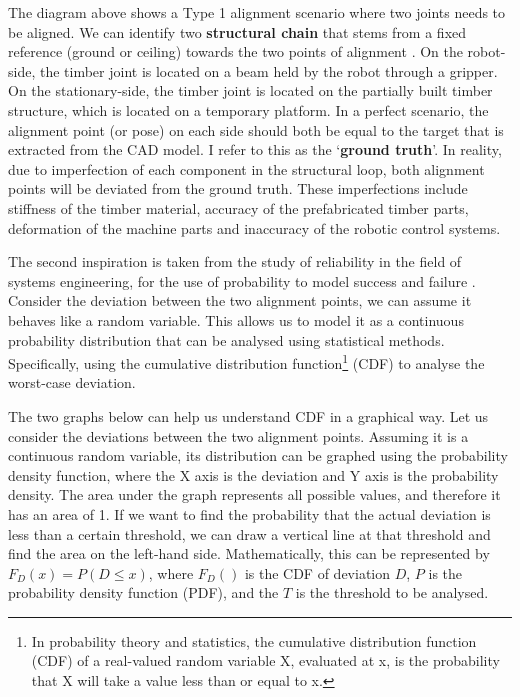 

The diagram above shows a Type 1 alignment scenario where two joints needs to be aligned. We can identify two \textbf{structural chain }that stems from a fixed reference (ground or ceiling) towards the two points of alignment \parencite{slocumPrecisionMachineDesign1992}. On the robot-side, the timber joint is located on a beam held by the robot through a gripper. On the stationary-side, the timber joint is located on the partially built timber structure, which is located on a temporary platform. In a perfect scenario, the alignment point (or pose) on each side should both be equal to the target that is extracted from the CAD model. I refer to this as the ‘\textbf{ground truth}’. In reality, due to imperfection of each component in the structural loop, both alignment points will be deviated from the ground truth. These imperfections include stiffness of the timber material, accuracy of the prefabricated timber parts, deformation of the machine parts and inaccuracy of the robotic control systems. 

The second inspiration is taken from the study of reliability in the field of systems engineering, for the use of probability to model success and failure \parencite{hallmannToleranceAllocationTolerancecost2020}. Consider the deviation between the two alignment points, we can assume it behaves like a random variable. This allows us to model it as a continuous probability distribution that can be analysed using statistical methods. Specifically, using the cumulative distribution function\footnote{ In probability theory and statistics, the cumulative distribution function (CDF) of a real-valued random variable X, evaluated at x, is the probability that X will take a value less than or equal to x. } (CDF) to analyse the worst-case deviation.

The two graphs below can help us understand CDF in a graphical way. Let us consider the deviations between the two alignment points. Assuming it is a continuous random variable, its distribution can be graphed using the probability density function, where the X axis is the deviation and Y axis is the probability density. The area under the graph represents all possible values, and therefore it has an area of 1. If we want to find the probability that the actual deviation is less than a certain threshold, we can draw a vertical line at that threshold and find the area on the left-hand side. Mathematically, this can be represented by $F_D (x) = P (D \leq x)$, where $F_D ()$ is the CDF of deviation $D$, $P$ is the probability density function (PDF), and the $T$ is the threshold to be analysed.

